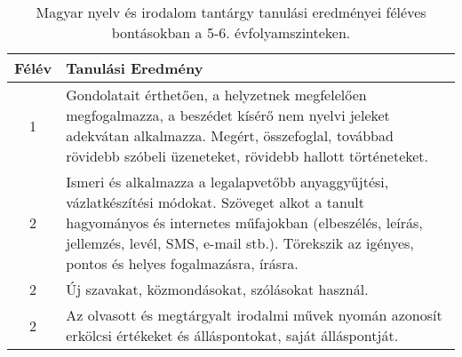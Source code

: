             \clearpage

       
           \begin{longtable}{c | p{} }
            \caption[Magyar nyelv és irodalom 5-6.]{Magyar nyelv és irodalom tantárgy tanulási eredményei féléves bontásokban a 5-6. évfolyamszinteken. }  \\

            \textbf{Félév} & \textbf{Tanulási Eredmény} \\
            \hline
            \endhead
                                
                                          1 &  Gondolatait érthetően, a helyzetnek megfelelően megfogalmazza, a beszédet kísérő nem nyelvi jeleket adekvátan alkalmazza. Megért, összefoglal, továbbad rövidebb szóbeli üzeneteket, rövidebb hallott történeteket. \\ \hline
                                      
                                
                                          2 &  Ismeri és alkalmazza a legalapvetőbb anyaggyűjtési, vázlatkészítési módokat. Szöveget alkot a tanult hagyományos és internetes műfajokban (elbeszélés, leírás, jellemzés, levél, SMS, e-mail stb.). Törekszik az igényes, pontos és helyes fogalmazásra, írásra. \\ \hline
                                          2 &  Új szavakat, közmondásokat, szólásokat használ. \\ \hline
                                          2 &  Az olvasott és megtárgyalt irodalmi művek nyomán azonosít erkölcsi értékeket és álláspontokat, saját álláspontját. \\ \hline
                                      

\end{longtable}
